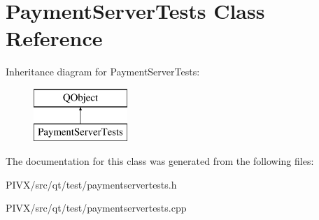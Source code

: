 \hypertarget{class_payment_server_tests}{}\section{Payment\+Server\+Tests Class Reference}
\label{class_payment_server_tests}
Inheritance diagram for Payment\+Server\+Tests\+:\begin{figure}[H]
\begin{center}
\leavevmode
\includegraphics[height=2.000000cm]{class_payment_server_tests}
\end{center}
\end{figure}


The documentation for this class was generated from the following files\+:\begin{DoxyCompactItemize}
\item 
P\+I\+V\+X/src/qt/test/paymentservertests.\+h\item 
P\+I\+V\+X/src/qt/test/paymentservertests.\+cpp\end{DoxyCompactItemize}
